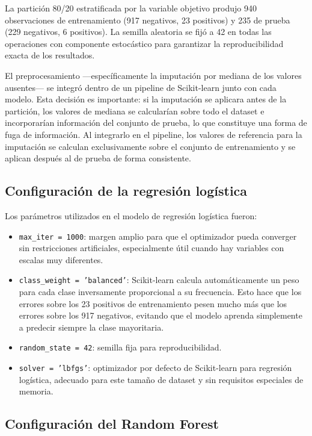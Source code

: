 \documentclass[12pt, a4paper, oneside]{report}
\begin{document}
La partición 80/20 estratificada por la variable objetivo produjo 940 observaciones de entrenamiento (917 negativos, 23 positivos) y 235 de prueba (229 negativos, 6 positivos). La semilla aleatoria se fijó a 42 en todas las operaciones con componente estocástico para garantizar la reproducibilidad exacta de los resultados.

El preprocesamiento —específicamente la imputación por mediana de los valores ausentes— se integró dentro de un pipeline de Scikit-learn junto con cada modelo. Esta decisión es importante: si la imputación se aplicara antes de la partición, los valores de mediana se calcularían sobre todo el dataset e incorporarían información del conjunto de prueba, lo que constituye una forma de fuga de información. Al integrarlo en el pipeline, los valores de referencia para la imputación se calculan exclusivamente sobre el conjunto de entrenamiento y se aplican después al de prueba de forma consistente.

\subsection{Configuración de la regresión logística}

Los parámetros utilizados en el modelo de regresión logística fueron:

\begin{itemize}
    \item \texttt{max\_iter = 1000}: margen amplio para que el optimizador pueda converger sin restricciones artificiales, especialmente útil cuando hay variables con escalas muy diferentes.
    \item \texttt{class\_weight = 'balanced'}: Scikit-learn calcula automáticamente un peso para cada clase inversamente proporcional a su frecuencia. Esto hace que los errores sobre los 23 positivos de entrenamiento pesen mucho más que los errores sobre los 917 negativos, evitando que el modelo aprenda simplemente a predecir siempre la clase mayoritaria.
    \item \texttt{random\_state = 42}: semilla fija para reproducibilidad.
    \item \texttt{solver = 'lbfgs'}: optimizador por defecto de Scikit-learn para regresión logística, adecuado para este tamaño de dataset y sin requisitos especiales de memoria.
\end{itemize}

\subsection{Configuración del Random Forest}
\end{document}

